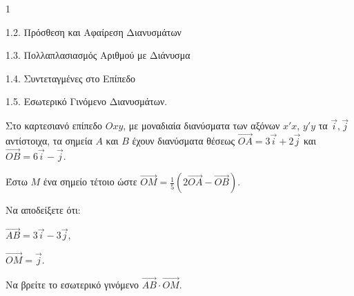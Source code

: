 \begin{ylh}{1}
    \item 1.2. Πρόσθεση και Αφαίρεση Διανυσμάτων
    \item 1.3. Πολλαπλασιασμός Αριθμού με Διάνυσμα
    \item 1.4. Συντεταγμένες στο Επίπεδο
    \item 1.5. Εσωτερικό Γινόμενο Διανυσμάτων.
\end{ylh}
Στο καρτεσιανό επίπεδο $Oxy$, με μοναδιαία διανύσματα των αξόνων $x'x$, $y'y$ τα $\vec{i}, \vec{j}$ αντίστοιχα, τα σημεία $A$ και $B$ έχουν διανύσματα θέσεως $\vec{OA} = 3\vec{i} + 2\vec{j}$ και $\vec{OB} = 6\vec{i} - \vec{j}$.

Έστω $M$ ένα σημείο τέτοιο ώστε $\vec{OM} = \frac{1}{5}(2\vec{OA} - \vec{OB})$.
\begin{alist}
\item Να αποδείξετε ότι:
    \begin{rlist}
    \item $\vec{AB} = 3\vec{i} - 3\vec{j}$, 
    \item $\vec{OM} = \vec{j}$. 
    \end{rlist}
\item Να βρείτε το εσωτερικό γινόμενο $\vec{AB} \cdot \vec{OM}$. 
\end{alist}